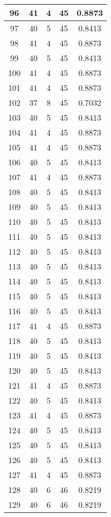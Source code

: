 \documentclass[letterpaper, 12pt]{article}
\begin{document}
\begin{longtable}{|c|c|c|c|c|}
\hline
96 & 41 & 4 & 45 & 0.8873 \\
\hline
97 & 40 & 5 & 45 & 0.8413 \\
\hline
98 & 41 & 4 & 45 & 0.8873 \\
\hline
99 & 40 & 5 & 45 & 0.8413 \\
\hline
100 & 41 & 4 & 45 & 0.8873 \\
\hline
101 & 41 & 4 & 45 & 0.8873 \\
\hline
102 & 37 & 8 & 45 & 0.7032 \\
\hline
103 & 40 & 5 & 45 & 0.8413 \\
\hline
104 & 41 & 4 & 45 & 0.8873 \\
\hline
105 & 41 & 4 & 45 & 0.8873 \\
\hline
106 & 40 & 5 & 45 & 0.8413 \\
\hline
107 & 41 & 4 & 45 & 0.8873 \\
\hline
108 & 40 & 5 & 45 & 0.8413 \\
\hline
109 & 40 & 5 & 45 & 0.8413 \\
\hline
110 & 40 & 5 & 45 & 0.8413 \\
\hline
111 & 40 & 5 & 45 & 0.8413 \\
\hline
112 & 40 & 5 & 45 & 0.8413 \\
\hline
113 & 40 & 5 & 45 & 0.8413 \\
\hline
114 & 40 & 5 & 45 & 0.8413 \\
\hline
115 & 40 & 5 & 45 & 0.8413 \\
\hline
116 & 40 & 5 & 45 & 0.8413 \\
\hline
117 & 41 & 4 & 45 & 0.8873 \\
\hline
118 & 40 & 5 & 45 & 0.8413 \\
\hline
119 & 40 & 5 & 45 & 0.8413 \\
\hline
120 & 40 & 5 & 45 & 0.8413 \\
\hline
121 & 41 & 4 & 45 & 0.8873 \\
\hline
122 & 40 & 5 & 45 & 0.8413 \\
\hline
123 & 41 & 4 & 45 & 0.8873 \\
\hline
124 & 40 & 5 & 45 & 0.8413 \\
\hline
125 & 40 & 5 & 45 & 0.8413 \\
\hline
126 & 40 & 5 & 45 & 0.8413 \\
\hline
127 & 41 & 4 & 45 & 0.8873 \\
\hline
128 & 40 & 6 & 46 & 0.8219 \\
\hline
129 & 40 & 6 & 46 & 0.8219 \\

\end{longtable}
\end{document}
